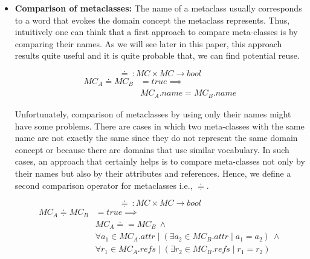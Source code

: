 \begin{itemize}
\item \textbf{Comparison of metaclasses:} The name of a metaclass usually corresponds to a word that evokes the domain concept the metaclass represents. Thus, intuitively one can think that a first approach to compare meta-classes is by comparing their names. As we will see later in this paper, this approach results quite useful and it is quite probable that, we can find potential reuse.

\begin{equation}
  \doteq~: MC \times MC \rightarrow bool
\end{equation}
\vspace{-1mm}
\begin{equation}
\begin{split}
  MC_{A} \doteq MC_{B} &= true \implies \\
   & MC_{A}.name = MC_{B}.name
 \end{split}
\end{equation}

\vspace{2mm}
\hspace{3mm} Unfortunately, comparison of metaclasses by using only their names might have some problems. There are cases in which two meta-classes with the same name are not exactly the same since they do not represent the same domain concept or because there are domains that use similar vocabulary. In such cases, an approach that certainly helps is to compare meta-classes not only by their names but also by their attributes and references. Hence, we define a second comparison operator for metaclasses i.e., $\doteqdot $.

\begin{equation}
  \doteqdot~: MC \times MC \rightarrow bool
\end{equation}
\vspace{-1mm}
\begin{equation}
\begin{split}
  MC_{A} \doteqdot MC_{B} &= true \implies \\
   & MC_{A} \doteq = MC_{B} ~ \wedge \\
   & \forall a_1 \in MC_{A}.attr \mid (\exists a_2 \in MC_{B}.attr \mid a_1 = a_2) ~ \wedge \\
   & \forall r_1 \in MC_{A}.refs \mid (\exists r_2 \in MC_{B}.refs \mid r_1 = r_2)
  \end{split}
\end{equation}




\end{itemize}
